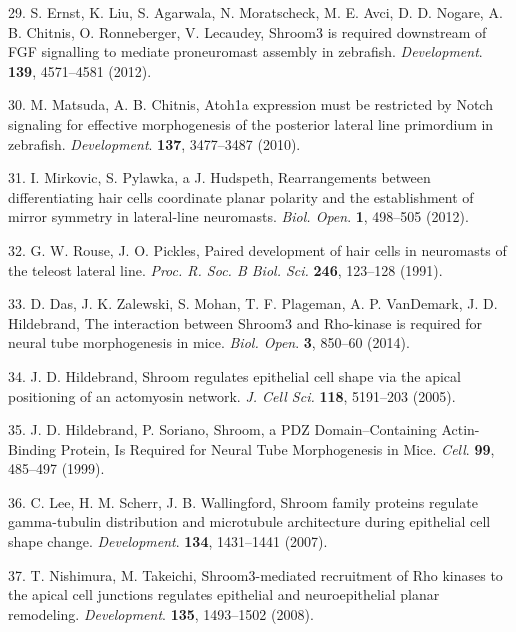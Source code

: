 \documentclass[11pt,singlespacinge,twoside]{reedthesis} %
\begin{document}
\leavevmode\hypertarget{ref-Ernst2012a}{}%
29. S. Ernst, K. Liu, S. Agarwala, N. Moratscheck, M. E. Avci, D. D. Nogare, A. B. Chitnis, O. Ronneberger, V. Lecaudey, Shroom3 is required downstream of FGF signalling to mediate proneuromast assembly in zebrafish. \emph{Development}. \textbf{139}, 4571--4581 (2012).

\leavevmode\hypertarget{ref-Matsuda2010b}{}%
30. M. Matsuda, A. B. Chitnis, Atoh1a expression must be restricted by Notch signaling for effective morphogenesis of the posterior lateral line primordium in zebrafish. \emph{Development}. \textbf{137}, 3477--3487 (2010).

\leavevmode\hypertarget{ref-Mirkovic2012}{}%
31. I. Mirkovic, S. Pylawka, a J. Hudspeth, Rearrangements between differentiating hair cells coordinate planar polarity and the establishment of mirror symmetry in lateral-line neuromasts. \emph{Biol. Open}. \textbf{1}, 498--505 (2012).

\leavevmode\hypertarget{ref-Rouse1991}{}%
32. G. W. Rouse, J. O. Pickles, Paired development of hair cells in neuromasts of the teleost lateral line. \emph{Proc. R. Soc. B Biol. Sci.} \textbf{246}, 123--128 (1991).

\leavevmode\hypertarget{ref-Das2014a}{}%
33. D. Das, J. K. Zalewski, S. Mohan, T. F. Plageman, A. P. VanDemark, J. D. Hildebrand, The interaction between Shroom3 and Rho-kinase is required for neural tube morphogenesis in mice. \emph{Biol. Open}. \textbf{3}, 850--60 (2014).

\leavevmode\hypertarget{ref-Hildebrand2005}{}%
34. J. D. Hildebrand, Shroom regulates epithelial cell shape via the apical positioning of an actomyosin network. \emph{J. Cell Sci.} \textbf{118}, 5191--203 (2005).

\leavevmode\hypertarget{ref-Hildebrand1999a}{}%
35. J. D. Hildebrand, P. Soriano, Shroom, a PDZ Domain--Containing Actin-Binding Protein, Is Required for Neural Tube Morphogenesis in Mice. \emph{Cell}. \textbf{99}, 485--497 (1999).

\leavevmode\hypertarget{ref-Lee2007}{}%
36. C. Lee, H. M. Scherr, J. B. Wallingford, Shroom family proteins regulate gamma-tubulin distribution and microtubule architecture during epithelial cell shape change. \emph{Development}. \textbf{134}, 1431--1441 (2007).

\leavevmode\hypertarget{ref-Nishimura2008}{}%
37. T. Nishimura, M. Takeichi, Shroom3-mediated recruitment of Rho kinases to the apical cell junctions regulates epithelial and neuroepithelial planar remodeling. \emph{Development}. \textbf{135}, 1493--1502 (2008).
\end{document}
